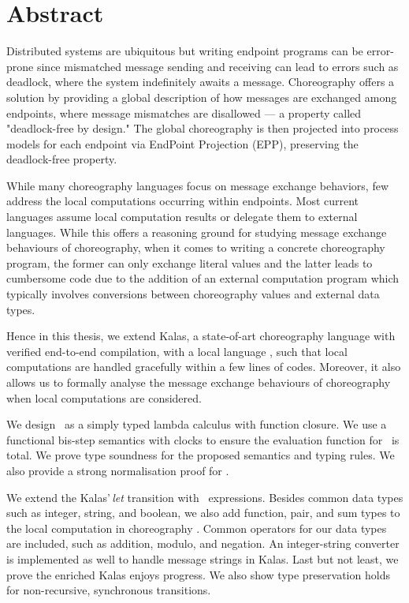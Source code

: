 \chapter*{Abstract}

Distributed systems are ubiquitous but writing endpoint programs can be 
error-prone since mismatched message sending and receiving can lead to 
errors such as deadlock, where the system indefinitely awaits a message.
Choreography offers a solution by providing a global description of how 
messages are exchanged among endpoints, where message mismatches are disallowed ---
a property called "deadlock-free by design." The global choreography 
is then projected into process models for each endpoint via EndPoint Projection (EPP),
preserving the deadlock-free property.

While many choreography languages focus on message exchange behaviors, few address 
the local computations occurring within endpoints. Most current languages assume local 
computation results or delegate them to external languages. While this offers a reasoning 
ground for studying message exchange behaviours of choreography, when it comes to writing 
a concrete choreography program, the former can only exchange literal values and the 
latter leads to cumbersome code due to the addition of an external computation program which 
typically involves conversions between choreography values and external data types.

Hence in this thesis, we extend Kalas, a state-of-art choreography language with
verified end-to-end compilation, with a local language \richerlang, such that
local computations are handled gracefully within a few lines of codes. Moreover,
it also allows us to formally analyse the message exchange behaviours of choreography 
when local computations are considered. 

We design \richerlang\, as a simply typed lambda calculus with function closure. We use
a functional bis-step semantics with clocks to ensure the evaluation function for
\richerlang\, is total. We prove type soundness for the proposed semantics and typing rules. 
We also provide a strong normalisation proof for \richerlang.

We extend the Kalas'\,\textit{let} transition with \richerlang\, expressions. Besides common data types 
such as integer, string, and boolean, we also add function, pair, and sum types to the 
local computation in choreography . Common operators for our data types are included, such as addition, modulo, 
and negation. An integer-string converter is implemented as well to handle message strings 
in Kalas. Last but not least, we prove the enriched Kalas enjoys progress. We also show
type preservation holds for non-recursive, synchronous transitions.



